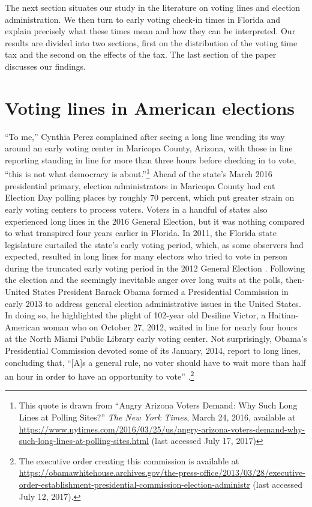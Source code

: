 \documentclass[12pt,titlepage]{article}
\begin{document}
The next section situates our study in the literature on voting lines
and election administration.  We then turn to early voting check-in
times in Florida and explain precisely what these times mean and how
they can be interpreted.  Our results are divided into two sections,
first on the distribution of the voting time tax and the second on the
effects of the tax.  The last section of the paper discusses our findings.

\section*{Voting lines in American elections}

``To me,'' Cynthia Perez complained after seeing a long line wending
its way around an early voting center in Maricopa County, Arizona,
with those in line reporting standing in line for more than three
hours before checking in to vote, ``this is not what democracy is
about.''\footnote{This quote is drawn from ``Angry Arizona Voters
  Demand: Why Such Long Lines at Polling Sites?'' \emph{The New York
    Times}, March 24, 2016, available at
  \url{https://www.nytimes.com/2016/03/25/us/angry-arizona-voters-demand-why-such-long-lines-at-polling-sites.html}
  (last accessed July 17, 2017)} Ahead of the state's March 2016
presidential primary, election administrators in Maricopa County had
cut Election Day polling places by roughly 70 percent, which put
greater strain on early voting centers to process voters. Voters in a
handful of states also experienced long lines in the 2016 General
Election, but it was nothing compared to what transpired four years
earlier in Florida.  In 2011, the Florida state legislature curtailed
the state's early voting period, which, as some observers had
expected, resulted in long lines for many electors who tried to vote
in person during the truncated early voting period in the 2012 General
Election \citep{herron_smith2014}.  Following the election and the
seemingly inevitable anger over long waits at the polls, then-United
States President Barack Obama formed a Presidential Commission in
early 2013 to address general election administrative issues in the
United States.  In doing so, he highlighted the plight of 102-year old
Desiline Victor, a Haitian-American woman who on October 27, 2012,
waited in line for nearly four hours at the North Miami Public Library
early voting center.  Not surprisingly, Obama's Presidential
Commission devoted some of its January, 2014, report to long lines,
concluding that, ``[A]s a general rule, no voter should have to wait
more than half an hour in order to have an opportunity to vote''
\citep[p.\ 13,][]{pcea:2014}.\footnote{The executive order creating
  this commission is available at
  \url{https://obamawhitehouse.archives.gov/the-press-office/2013/03/28/executive-order-establishment-presidential-commission-election-administr}
  (last accessed July 12, 2017).}
\end{document}
